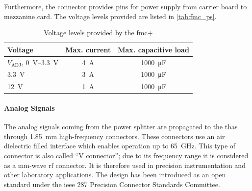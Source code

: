 Furthermore, the connector provides pins for power supply from carrier board to mezzanine card. \cite{fmc} The voltage levels provided are listed in \autoref{tab:fmc_ps}.

\begin{table}[tbh]
	\caption[FMC+ Voltages]{Voltage levels provided by the \gls{fmc}+}
	\label{tab:fmc_ps}
		\centering
		\begin{tabularx}{\textwidth}{Xcc}
			\toprule
			\textbf{Voltage} & \textbf{Max. current} & \textbf{Max. capacitive load}\\
			\midrule
			$V_\text{ADJ}$, \SIrange{0}{3.3}{\volt} & \SI{4}{\ampere} & \SI{1000}{\micro \farad}\\
			\SI{3.3}{\volt} & \SI{3}{\ampere} & \SI{1000}{\micro \farad}\\
			\SI{12}{\volt} & \SI{1}{\ampere} & \SI{1000}{\micro \farad}\\
			\bottomrule
		\end{tabularx}
\end{table}

\paragraph{Analog Signals}
The analog signals coming from the power splitter are propagated to the \glspl{tha} through \SI{1.85}{\mm} high-frequency connectors. 
These connectors use an air dielectric filled interface which enables operation up to \SI{65}{\GHz}. 
This type of connector is also called ``V connector''; due to its frequency range it is considered as a mm-wave \gls{rf} connector.
It is therefore used in precision instrumentation and other laboratory applications.
The design has been introduced as an open standard under the \gls{ieee} 287 Precision Connector Standards Committee.

